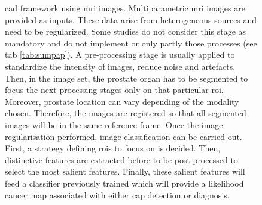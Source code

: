 \begin{figure}
\begin{adjustwidth}{-1.5cm}{}
\caption{\ac{cad} framework using \ac{mri} images. Multiparametric \ac{mri} images are provided as inputs. These data arise from heterogeneous sources and need to be regularized. Some studies do not consider this stage as mandatory and do not implement or only partly those processes (see \acs{tab} \ref{tab:sumpap}). A pre-processing stage is usually applied to standardize the intensity of images, reduce noise and artefacts. Then, in the image set, the prostate organ has to be segmented to focus the next processing stages only on that particular \ac{roi}. Moreover, prostate location can vary depending of the modality chosen. Therefore, the images are registered so that all segmented images will be in the same reference frame. Once the image regularisation performed, image classification can be carried out. First, a strategy defining \acp{roi} to focus on is decided. Then, distinctive features are extracted before to be post-processed to select the most salient features. Finally, these salient features will feed a classifier previously trained which will provide a likelihood cancer map associated with either \ac{cap} detection or diagnosis.}
\end{adjustwidth}
\label{fig:wkfcad}
\end{figure}

